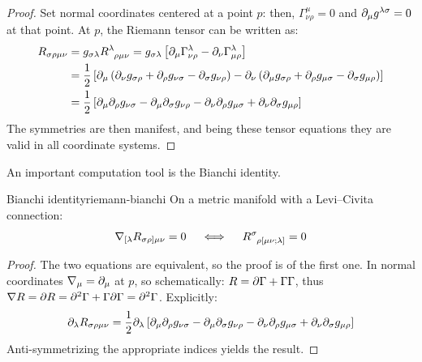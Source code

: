 \begin{proofbox}
  \begin{proof}
    Set normal coordinates centered at a point $ p $: then, $ \Gamma^\mu_{\nu \rho} = 0 $ and $ \partial_\mu g^{\lambda \sigma} = 0 $ at that point. At $ p $, the Riemann tensor can be written as:
    \begin{equation*}
      \begin{split}
        R_{\sigma \rho \mu \nu}
        &= g_{\sigma \lambda} \tensor{R}{^\lambda _{\rho \mu \nu}} = g_{\sigma \lambda} \left[ \pa_\mu \Gamma^\lambda_{\nu \rho} - \pa_\nu \Gamma^\lambda_{\mu \rho} \right] \\
        &= \frac{1}{2} \left[ \pa_\mu \left( \pa_\nu g_{\sigma \rho} + \pa_\rho g_{\nu \sigma} - \pa_\sigma g_{\nu \rho} \right) - \pa_\nu \left( \pa_\mu g_{\sigma \rho} + \pa_\rho g_{\mu \sigma} - \pa_\sigma g_{\mu \rho} \right) \right] \\
        &= \frac{1}{2} \left[ \pa_\mu \pa_\rho g_{\nu \sigma} - \pa_\mu \pa_\sigma g_{\nu \rho} - \pa_\nu \pa_\rho g_{\mu \sigma} + \pa_\nu \pa_\sigma g_{\mu \rho} \right]
      \end{split}
    \end{equation*}
    The symmetries are then manifest, and being these tensor equations they are valid in all coordinate systems.
  \end{proof}
\end{proofbox}

An important computation tool is the Bianchi identity.

\begin{theorem}{Bianchi identity}{riemann-bianchi}
  On a metric manifold with a Levi--Civita connection:
  \begin{equation}
    \na_{[\lambda} R_{\sigma \rho] \mu \nu} = 0
    \quad \iff \quad
    \tensor{R}{^\sigma_{\rho [\mu \nu ; \lambda]}} = 0
    \label{eq:riemann-bianchi}
  \end{equation}
\end{theorem}

\begin{proofbox}
  \begin{proof}
    The two equations are equivalent, so the proof is of the first one. In normal coordinates $ \nabla_\mu = \partial_\mu $ at $ p $, so schematically: $ R = \partial \Gamma + \Gamma \Gamma $, thus $ \nabla R = \partial R = \partial^2 \Gamma + \Gamma \partial \Gamma = \partial^2 \Gamma $. Explicitly:
    \begin{equation*}
      \partial_\lambda R_{\sigma \rho \mu \nu} = \frac{1}{2} \partial_\lambda \left[ \partial_\mu \partial_\rho g_{\nu \sigma} - \partial_\mu \partial_\sigma g_{\nu \rho} - \partial_\nu \partial_\rho g_{\mu \sigma} + \partial_\nu \partial_\sigma g_{\mu \rho} \right]
    \end{equation*}
    Anti-symmetrizing the appropriate indices yields the result.
  \end{proof}
\end{proofbox}

